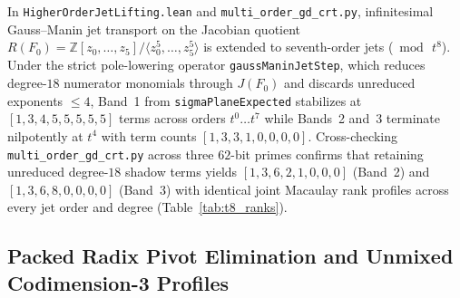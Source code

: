 \documentclass[11pt,a4paper]{article}
\begin{document}
In \texttt{HigherOrderJetLifting.lean} and \texttt{multi\_order\_gd\_crt.py}, infinitesimal Gauss--Manin jet transport on the Jacobian quotient $R(F_0) = \mathbb{Z}[z_0,\dots,z_5]/\langle z_0^5,\dots,z_5^5\rangle$ is extended to seventh-order jets ($\bmod\, t^8$). Under the strict pole-lowering operator \texttt{gaussManinJetStep}, which reduces degree-$18$ numerator monomials through $J(F_0)$ and discards unreduced exponents $\le 4$, Band~1 from \texttt{sigmaPlaneExpected} stabilizes at $[1, 3, 4, 5, 5, 5, 5, 5]$ terms across orders $t^0\dots t^7$ while Bands~2 and~3 terminate nilpotently at $t^4$ with term counts $[1, 3, 3, 1, 0, 0, 0, 0]$. Cross-checking \texttt{multi\_order\_gd\_crt.py} across three $62$-bit primes confirms that retaining unreduced degree-$18$ shadow terms yields $[1, 3, 6, 2, 1, 0, 0, 0]$ (Band~2) and $[1, 3, 6, 8, 0, 0, 0, 0]$ (Band~3) with identical joint Macaulay rank profiles across every jet order and degree (Table~\ref{tab:t8_ranks}).

\begin{table}[htbp]
  \centering
  \caption{Joint Macaulay contraction ranks through $\bmod\, t^8$ alongside unmixed codimension-$3$ complete-intersection quotient profiles in $R(F_0)$.}
  \label{tab:t8_ranks}
\end{table}

\subsection{Packed Radix Pivot Elimination and Unmixed Codimension-3 Profiles}
\end{document}
